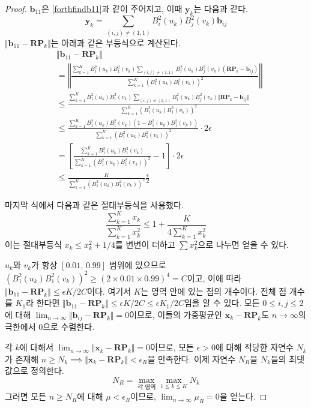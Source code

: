 \documentclass{gshs_thesis}
\theoremstyle{theorem}
\theoremstyle{lemma}
\theoremstyle{definition}
\begin{document}
\begin{proof}
	$\mathbf{b}_{11}$은 \eqref{forthfindb11}과 같이 주어지고, 이때 $\mathbf{y}_k$는 다음과 같다.
	$$ \mathbf{y}_k = \sum_{(i, j) \neq (1, 1)} B_i^2(u_k) B_j^2(v_k) \mathbf{b}_{ij} $$ $\Vert \mathbf{b}_{11} - \mathbf{RP}_k \Vert$는 아래과 같은 부등식으로 계산된다. 
	\begin{align*}
		&\Vert \mathbf{b}_{11} - \mathbf{RP}_k \Vert \\
		&= \left\Vert \frac{\sum_{k=1}^K B_1^2(u_k) B_1^2(v_k) \sum_{(i, j) \neq (1, 1)} B_i^2(u_k) B_j^2(v_k) (\mathbf{RP}_k - \mathbf{b}_{ij})}{\sum_{k=1}^K (B_1^2(u_k) B_1^2(v_k))^2} \right\Vert \\
		&\leq \frac{\sum_{k=1}^K B_1^2(u_k) B_1^2(v_k) \sum_{(i, j) \neq (1, 1)} B_i^2(u_k) B_j^2(v_k) \Vert \mathbf{RP}_k - \mathbf{b}_{ij} \Vert}{\sum_{k=1}^K (B_1^2(u_k) B_1^2(v_k))^2} \\
		&\leq \frac{\sum_{k=1}^K B_1^2(u_k) B_1^2(v_k) (1 - B_1^2(u_k) B_1^2(v_k))}{\sum_{k=1}^K (B_1^2(u_k) B_1^2(v_k))^2} \cdot 2\epsilon \\
		&= \left[ \frac{\sum_{k=1}^K B_1^2(u_k) B_1^2(v_k)}{\sum_{k=1}^K (B_1^2(u_k) B_1^2(v_k))^2} - 1 \right] \cdot 2\epsilon \\
		&\leq \frac{K}{\sum_{k=1}^K (B_1^2(u_k) B_1^2(v_k))^2} \frac\epsilon2
	\end{align*}
	
	마지막 식에서 다음과 같은 절대부등식을 사용했다.
	$$ \frac{\sum_{k=1}^K x_k}{\sum_{k=1}^K x_k^2} \leq 1 + \frac{K}{4\sum_{k=1}^K x_k^2} $$
	이는 절대부등식 $x_k \leq x_k^2 + 1/4$를 변변이 더하고 $\sum x_k^2$으로 나누면 얻을 수 있다. 
	
	$u_k$와 $v_k$가 항상 $[0.01, \, 0.99]$ 범위에 있으므로 $(B_1^2(u_k) B_1^2(v_k))^2 \geq (2 \times 0.01 \times 0.99)^4 = C$이고, 이에 따라 $\Vert \mathbf{b}_{11} - \mathbf{RP}_k \Vert \leq \epsilon K / 2C$이다. 여기서 $K$는 영역 안에 있는 점의 개수이다. 전체 점 개수를 $K_{1}$라 한다면  $\Vert \mathbf{b}_{11} - \mathbf{RP}_k \Vert \leq \epsilon K / 2C \leq \epsilon K_{1} / 2C$임을 알 수 있다. 모든 $0 \leq i, j \leq 2$에 대해 $\lim_{n \to \infty} \Vert \mathbf{b}_{ij} - \mathbf{RP}_k \Vert = 0$이므로, 이들의 가중평균인 $\mathbf{x}_k - \mathbf{RP}_k$도 $n \to \infty$의 극한에서 $0$으로 수렴한다. 
	
	각 $k$에 대해서 $\lim_{n \to \infty} \Vert \mathbf{x}_k - \mathbf{RP}_k \Vert = 0$이므로, 모든 $\epsilon > 0$에 대해 적당한 자연수 $N_k$가 존재해 $n \geq N_k \implies \Vert \mathbf{x}_k - \mathbf{RP}_k \Vert < \epsilon_{R}$을 만족한다. 이제 자연수 $N_{R}$을 $N_k$들의 최댓값으로 정의한다. 
	$$ N_{R} = \max_{\text{각 영역}} \max_{1 \leq k \leq K} N_k $$
	그러면 모든 $n \geq N_{R}$에 대해 $\mu < \epsilon_{R}$이므로, $\lim_{n \to \infty} \mu_{R} = 0$을 얻는다. 
\end{proof}
\end{document}
